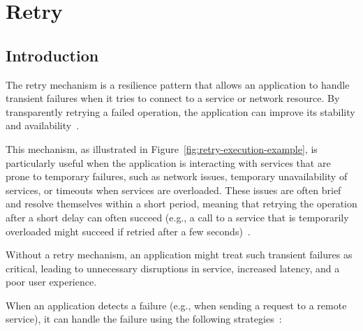 \chapter{Retry}\label{ch:retry}

\section{Introduction}\label{sec:retry-context}

The retry mechanism is a resilience pattern that allows an application to handle transient failures when it tries to connect to a service or network resource.
By transparently retrying a failed operation, the application can improve its stability and availability~\cite{microsoft-retry-pattern}.

This mechanism, as illustrated in Figure~\ref{fig:retry-execution-example}, is particularly useful when the application is interacting with services that are prone to temporary failures, such as network issues, temporary unavailability of services, or timeouts when services are overloaded.
These issues are often brief and resolve themselves within a short period, meaning that retrying the operation after a short delay can often succeed (e.g., a call to a service that is temporarily overloaded might succeed if retried after a few seconds)~\cite{microsoft-retry-pattern}.

Without a retry mechanism, an application might treat such transient failures as critical,
leading to unnecessary disruptions in service, increased latency, and a poor user experience.

When an application detects a failure (e.g., when sending a request to a remote service), it can handle the failure using the following strategies~\cite{microsoft-retry-pattern}:

